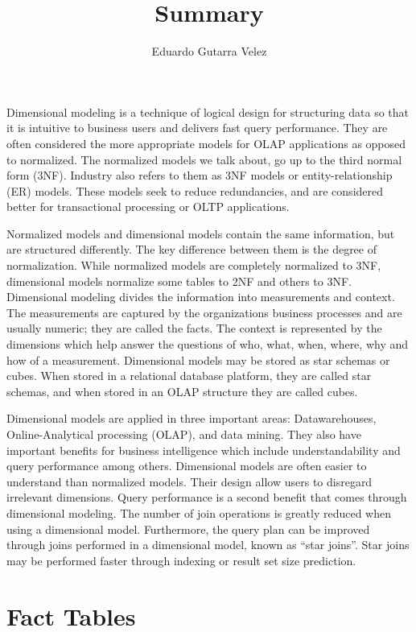\documentclass[]{article}
\title{Summary}
\author{Eduardo Gutarra Velez}
\begin{document}
\ifpdf
{}
\else
{}
\fi

\maketitle

Dimensional modeling is a technique of logical design for structuring data so that it is intuitive to business users and delivers fast query performance. They
are often considered the more appropriate models for OLAP applications as opposed to normalized. The normalized models we talk about, go up to the third normal
form (3NF). Industry also refers to them as 3NF models or entity-relationship (ER) models. These models seek to reduce redundancies, and are considered better
for transactional processing or OLTP applications.

Normalized models and dimensional models contain the same information, but are structured differently. The key difference between them is the degree of
normalization. While normalized models are completely normalized to 3NF, dimensional models normalize some tables to 2NF and others to 3NF. Dimensional modeling
divides the information into measurements and context. The measurements are captured by the organizations business processes and are usually numeric; they are
called the facts. The context is represented by the dimensions which help answer the questions of who, what, when, where, why and how of a measurement.
Dimensional models may be stored as star schemas or cubes. When stored in a relational database platform, they are called star schemas, and when stored in an
OLAP structure they are called cubes.

Dimensional models are applied in three important areas: Datawarehouses, Online-Analytical processing (OLAP), and data mining. They also have important benefits
for business intelligence which include understandability and query performance among others. Dimensional models are often easier to understand than normalized
models. Their design allow users to disregard irrelevant dimensions. Query performance is a second benefit that comes through dimensional modeling. The number of
join operations is greatly reduced when using a dimensional model. Furthermore, the query plan can be improved through joins performed in a dimensional model,
known as ``star joins''. Star joins may be performed faster through indexing or result set size prediction.

\section{Fact Tables} %
\label{sec:fact_tables}
\end{document}
